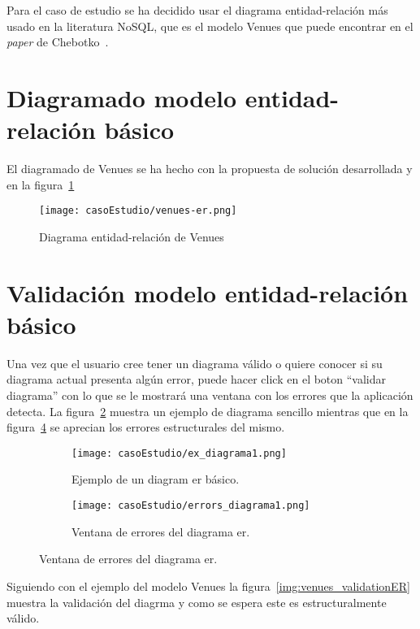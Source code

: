 Para el caso de estudio se ha decidido usar el diagrama entidad-relación más usado en la literatura NoSQL, que es el modelo Venues que puede encontrar en el \textit{paper} de Chebotko~\cite{chebotko_big_2015}.

\section{Diagramado modelo entidad-relación básico}

El diagramado de Venues se ha hecho con la propuesta de solución desarrollada y en la figura~\ref{img:venues-er}

\begin{figure}[H]
    \centering
    \texttt{[image: casoEstudio/venues-er.png]}
    \caption{Diagrama entidad-relación de Venues}
    \label{img:venues-er}
\end{figure}

\section{Validación modelo entidad-relación básico}

 Una vez que el usuario cree tener un diagrama válido o quiere conocer si su diagrama actual presenta algún error, puede hacer click en el boton ``validar diagrama'' con lo que se le mostrará una ventana con los errores que la aplicación detecta. La figura~\ref{img:ex_diagrama1} muestra un ejemplo de diagrama sencillo mientras que en la figura~\ref{img:errors_diagrama1} se aprecian los errores estructurales del mismo.

 \begin{figure}[H]
  \begin{subfigure}[b]{0.49\textwidth}
      \texttt{[image: casoEstudio/ex\_diagrama1.png]}
      \caption{Ejemplo de un diagram er básico.}
      \label{img:ex_diagrama1}
    \end{subfigure}
    \hfill
    \begin{subfigure}[b]{0.49\textwidth}
      \texttt{[image: casoEstudio/errors\_diagrama1.png]}
      \caption{Ventana de errores del diagrama er.}
      \label{img:errors_diagrama1}
    \end{subfigure}
\end{figure}

 Siguiendo con el ejemplo del modelo Venues la figura~\ref{img:venues_validationER} muestra la validación del diagrma y como se espera este es estructuralmente válido.

